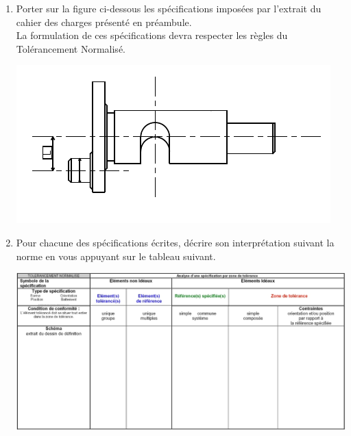 \begin{enumerate}
\item Porter sur la figure ci-dessous les spécifications imposées par l'extrait du cahier des charges
présenté en préambule.\\
La formulation de ces spécifications devra respecter les règles du Tolérancement Normalisé.

\begin{center}
\includegraphics[scale=0.8]{png/vilbrequin.png}
\end{center}

\item Pour chacune des spécifications écrites, décrire son interprétation suivant la norme en vous appuyant sur le tableau suivant.

\begin{center}
\includegraphics[scale=0.55]{png/doc_rep.png}
\end{center}

\end{enumerate}

\newpage
